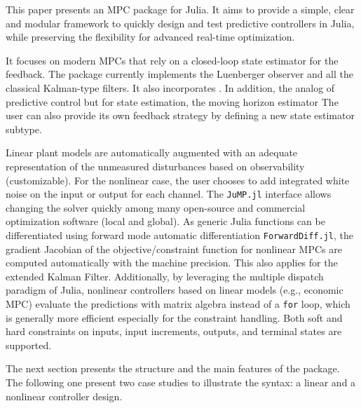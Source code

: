 This paper presents an MPC package for Julia. It aims to provide a simple, clear and modular framework to quickly design and test predictive controllers in Julia, while preserving the flexibility for advanced real-time optimization. 

It focuses on modern MPCs that rely on a closed-loop state estimator for the feedback. The package currently implements the Luenberger observer and all the classical Kalman-type filters. It also incorporates . In addition, the analog of predictive control but for state estimation, the moving horizon estimator The user can also provide its own feedback strategy by defining a new state estimator subtype.

Linear plant models are automatically augmented with an adequate representation of the unmeasured disturbances based on observability (customizable). For the nonlinear case, the user chooses to add integrated white noise on the input or output for each channel. The \texttt{JuMP.jl} interface allows changing the solver quickly among  many open-source and commercial optimization software (local and global). As generic Julia functions can be differentiated using forward mode automatic differentiation \texttt{ForwardDiff.jl}\added{)}, the gradient Jacobian of the objective/constraint function for nonlinear MPCs are computed automatically with the machine precision. This also applies for the extended Kalman Filter. Additionally, by leveraging the multiple dispatch paradigm of Julia, nonlinear controllers based on linear models (e.g., economic MPC) evaluate the predictions with matrix algebra instead of a \texttt{for} loop, which is generally more efficient especially for the constraint handling. Both soft and hard constraints on inputs, input increments, outputs, and terminal states are supported. 

The next section presents the structure and the main features of the package. The following one present two case studies to illustrate the syntax: a linear and a nonlinear controller design.